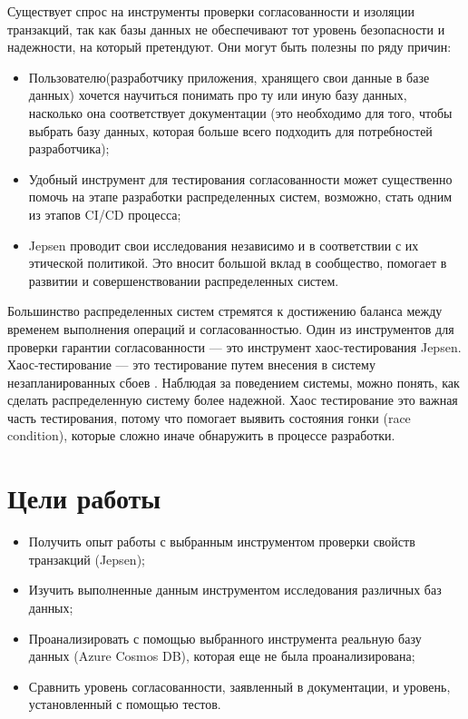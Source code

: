 \documentclass[12pt,  openany]{book}
\begin{document}
Существует спрос на инструменты проверки согласованности и изоляции транзакций, так как базы данных не обеспечивают тот уровень безопасности и надежности, на который претендуют.  Они могут быть полезны по ряду причин:
\begin{itemize}
\item Пользователю(разработчику приложения, хранящего свои данные в базе данных) хочется научиться понимать про ту или иную базу данных, насколько она соответствует документации (это необходимо для того, чтобы выбрать базу данных, которая больше всего подходить для потребностей разработчика);
\item Удобный инструмент для тестирования согласованности может существенно помочь на этапе разработки распределенных систем, возможно, стать одним из этапов CI/CD процесса;
\item Jepsen проводит свои исследования независимо и в соответствии с их этической политикой. Это вносит большой вклад в сообщество, помогает в развитии и совершенствовании распределенных систем.
\end{itemize}
Большинство распределенных систем стремятся к достижению баланса между временем выполнения операций и согласованностью.  Один из инструментов для проверки гарантии согласованности --- это инструмент хаос-тестирования Jepsen.  Хаос-тестирование --- это тестирование путем внесения в систему незапланированных сбоев \cite{chaosTesting}.  Наблюдая за поведением системы, можно понять, как сделать распределенную систему более надежной. Хаос тестирование это важная часть тестирования, потому что помогает выявить состояния гонки (race condition), которые сложно иначе обнаружить в процессе разработки.

\section{Цели работы}
\begin{itemize}
  \item Получить опыт работы с выбранным инструментом проверки свойств транзакций (Jepsen);
  \item Изучить выполненные данным инструментом исследования различных баз данных;
  \item Проанализировать с помощью выбранного инструмента реальную базу данных (Azure Cosmos DB), которая еще не была проанализирована;
  \item Сравнить уровень согласованности, заявленный в документации, и уровень, установленный с помощью тестов.
\end{itemize}
\end{document}
